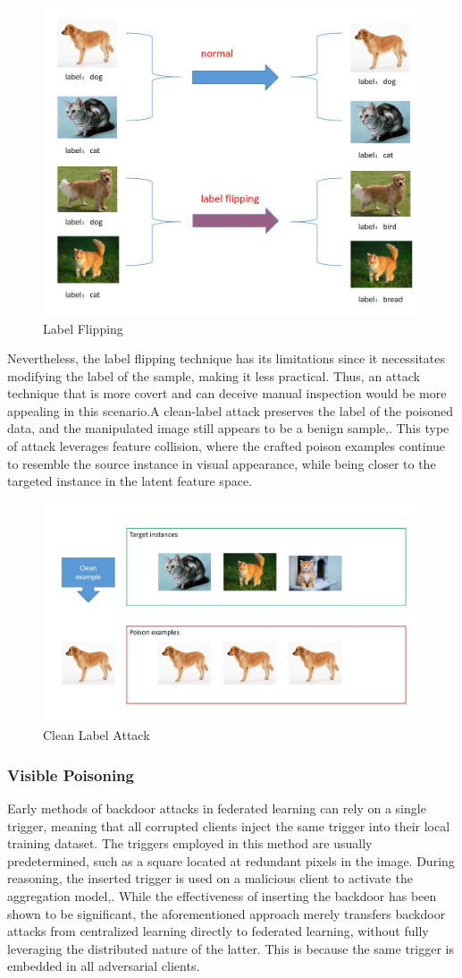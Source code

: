 \documentclass[conference]{IEEEtran}
\begin{document}
\begin{figure}[htbp]
    \centerline{\includegraphics[width=0.8\linewidth,height=0.4\linewidth]{picture/f6.jpg}}
    \caption{Label Flipping}
    \label{fig6}
\end{figure}

Nevertheless, the label flipping technique has its limitations since it necessitates
modifying the label of the sample, making it less practical. Thus, an attack
technique that is more covert and can deceive manual inspection would be more
appealing in this scenario.A clean-label attack preserves the label of the poisoned data,
and the manipulated image still appears to be a benign sample\cite{b57},\cite{b58}. This type of attack
leverages feature collision, where the crafted poison examples continue to
resemble the source instance in visual appearance, while being closer to the
targeted instance in the latent feature space.

\begin{figure}[htbp]
    \centerline{\includegraphics[width=0.8\linewidth,height=0.4\linewidth]{picture/f7.jpg}}
    \caption{Clean Label Attack}
    \label{fig7}
\end{figure}

\subsubsection{Visible Poisoning}
Early methods of  backdoor attacks in federated learning can rely on a single trigger,
meaning that all corrupted clients inject the same trigger into their local
training dataset. The triggers employed in this method are usually predetermined,
such as a square located at redundant pixels in the image. During reasoning,
the inserted trigger is used on a malicious client to activate the aggregation model\cite{b24},\cite{b27}.
While the effectiveness of inserting the backdoor has been shown to be significant,
the aforementioned approach merely transfers backdoor attacks from centralized
learning directly to federated learning, without fully leveraging
the distributed nature of the latter. This is
because the same trigger is embedded in all adversarial clients.
\end{document}
